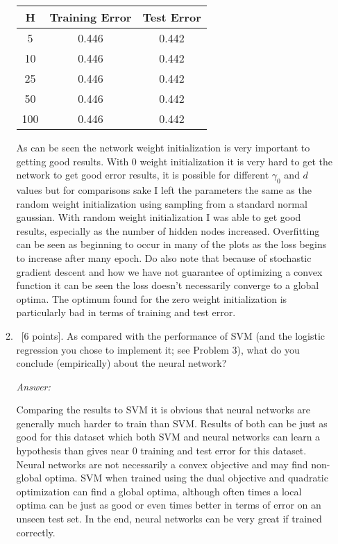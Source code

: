 \documentclass[12pt, fullpage,letterpaper]{article}
\begin{document}
\begin{enumerate}
\begin{enumerate}
	\begin{center}
	\begin{tabular}{|c|c|c|}
		\hline
		H & Training Error & Test Error \\ 
		\hline
		5 & 0.446 & 0.442 \\
		\hline
		10 & 0.446 & 0.442 \\
		\hline
		25 & 0.446 & 0.442 \\
		\hline
		50 & 0.446 & 0.442 \\
		\hline
		100 & 0.446 & 0.442 \\
		\hline
	\end{tabular}
	\end{center}

	As can be seen the network weight initialization is very important to getting good results.
	With $0$ weight initialization it is very hard to get the network to get good error results, it is possible for different $\gamma_0$ and $d$ values but for comparisons sake I left the parameters the same as the random weight initialization using sampling from a standard normal gaussian.
	With random weight initialization I was able to get good results, especially as the number of hidden nodes increased.
	Overfitting can be seen as beginning to occur in many of the plots as the loss begins to increase after many epoch.
	Do also note that because of stochastic gradient descent and how we have not guarantee of optimizing a convex function it can be seen the loss doesn't necessarily converge to a global optima. The optimum found for the zero weight initialization is particularly bad in terms of training and test error.

	\item~[6 points]. As compared with the performance of SVM (and the logistic regression you chose to implement it; see Problem 3), what do you conclude (empirically) about the neural network?

	\textit{Answer:}
	
	Comparing the results to SVM it is obvious that neural networks are generally much harder to train than SVM.
	Results of both can be just as good for this dataset which both SVM and neural networks can learn a hypothesis than gives near 0 training and test error for this dataset.
	Neural networks are not necessarily a convex objective and may find non-global optima.
	SVM when trained using the dual objective and quadratic optimization can find a global optima, although often times a local optima can be just as good or even times better in terms of error on an unseen test set.
	In the end, neural networks can be very great if trained correctly.
	

\end{enumerate}
\end{enumerate}
\end{document}
